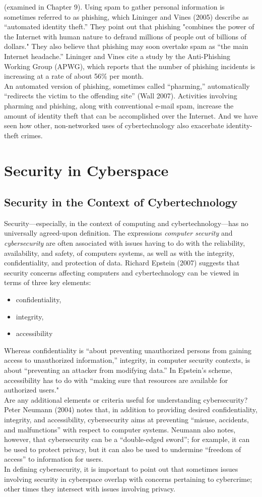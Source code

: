 \documentclass[12pt]{article}
\theoremstyle{definition}
\begin{document}
(examined in Chapter 9). Using spam to gather personal information is sometimes
referred to as phishing, which Lininger and Vines (2005) describe as “automated identity
theft.” They point out that phishing "combines the power of the Internet with human
nature to defraud millions of people out of billions of dollars." They also believe that phishing may soon overtake spam as “the main Internet headache.” Lininger and Vines
cite a study by the Anti-Phishing Working Group (APWG), which reports that the
number of phishing incidents is increasing at a rate of about 56\% per month.\\
An automated version of phishing, sometimes called “pharming,” automatically
“redirects the victim to the offending site” (Wall 2007). Activities involving pharming and
phishing, along with conventional e-mail spam, increase the amount of identity theft that
can be accomplished over the Internet. And we have seen how other, non-networked
uses of cybertechnology also exacerbate identity-theft crimes.
\clearpage
\section{Security in Cyberspace}
\subsection{Security in the Context of Cybertechnology}
Security—especially, in the context of computing and cybertechnology—has no universally
agreed-upon definition. The expressions \textit{computer security} and \textit{cybersecurity} are
often associated with issues having to do with the reliability, availability, and safety, of
computers systems, as well as with the integrity, confidentiality, and protection of data.
Richard Epstein (2007) suggests that security concerns affecting computers and cybertechnology
can be viewed in terms of three key elements:
\begin{itemize}
\item confidentiality,
\item integrity,
\item accessibility
\end{itemize}
Whereas confidentiality is “about preventing unauthorized persons from gaining
access to unauthorized information,” integrity, in computer security contexts, is about
“preventing an attacker from modifying data.” In Epstein’s scheme, accessibility has to
do with “making sure that resources are available for authorized users."\\
Are any additional elements or criteria useful for understanding cybersecurity? Peter
Neumann (2004) notes that, in addition to providing desired confidentiality, integrity,
and accessibility, cybersecurity aims at preventing “misuse, accidents, and malfunctions”
with respect to computer systems. Neumann also notes, however, that cybersecurity can
be a “double-edged sword”; for example, it can be used to protect privacy, but it can also
be used to undermine “freedom of access” to information for users.\\
In defining cybersecurity, it is important to point out that sometimes issues involving
security in cyberspace overlap with concerns pertaining to cybercrime; other times
they intersect with issues involving privacy.
\end{document}
